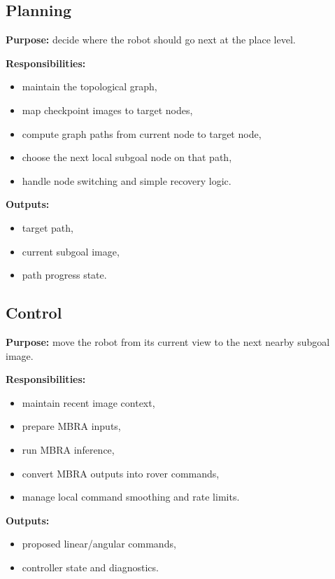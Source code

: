 \documentclass[11pt,a4paper]{article}
\begin{document}
\subsection{Planning}

\textbf{Purpose:} decide where the robot should go next at the place level.

\textbf{Responsibilities:}
\begin{itemize}[nosep]
  \item maintain the topological graph,
  \item map checkpoint images to target nodes,
  \item compute graph paths from current node to target node,
  \item choose the next local subgoal node on that path,
  \item handle node switching and simple recovery logic.
\end{itemize}

\textbf{Outputs:}
\begin{itemize}[nosep]
  \item target path,
  \item current subgoal image,
  \item path progress state.
\end{itemize}


\subsection{Control}

\textbf{Purpose:} move the robot from its current view to the next nearby
subgoal image.

\textbf{Responsibilities:}
\begin{itemize}[nosep]
  \item maintain recent image context,
  \item prepare MBRA inputs,
  \item run MBRA inference,
  \item convert MBRA outputs into rover commands,
  \item manage local command smoothing and rate limits.
\end{itemize}

\textbf{Outputs:}
\begin{itemize}[nosep]
  \item proposed linear/angular commands,
  \item controller state and diagnostics.
\end{itemize}
\end{document}
